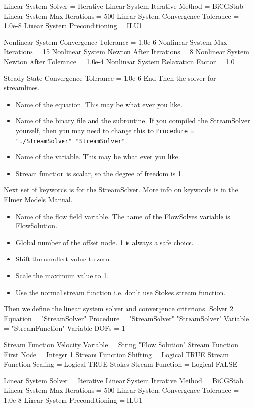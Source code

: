   Linear System Solver = Iterative
  Linear System Iterative Method = BiCGStab
  Linear System Max Iterations = 500
  Linear System Convergence Tolerance = 1.0e-8
  Linear System Preconditioning = ILU1

  Nonlinear System Convergence Tolerance = 1.0e-6
  Nonlinear System Max Iterations = 15
  Nonlinear System Newton After Iterations = 8
  Nonlinear System Newton After Tolerance = 1.0e-4
  Nonlinear System Relaxation Factor = 1.0

  Steady State Convergence Tolerance = 1.0e-6
End
\ttend
Then the solver for streamlines.
\begin{itemize}
\item Name of the equation. This may be what ever you like.
\item Name of the binary file and the subroutine. If you compiled the StreamSolver yourself,
then you may need to change this to \texttt{Procedure = "./StreamSolver" "StreamSolver"}.
\item Name of the variable. This may be what ever you like.
\item Stream function is scalar, so the degree of freedom is 1.
\end{itemize}
Next set of keywords is for the StreamSolver. More info on keywords is in the Elmer
Models Manual.
\begin{itemize}
\item Name of the flow field variable. The name of the FlowSolves variable is FlowSolution.
\item Global number of the offset node. 1 is always a safe choice.
\item Shift the smallest value to zero.
\item Scale the maximum value to 1.
\item Use the normal stream function i.e. don't use Stokes stream function.
\end{itemize}
Then we define the linear system solver and convergence criterions.
\ttbegin
Solver 2
  Equation = "StreamSolver"
  Procedure = "StreamSolver" "StreamSolver"
  Variable = "StreamFunction"
  Variable DOFs = 1

  Stream Function Velocity Variable = String "Flow Solution"
  Stream Function First Node = Integer 1
  Stream Function Shifting = Logical TRUE
  Stream Function Scaling = Logical TRUE
  Stokes Stream Function = Logical FALSE

  Linear System Solver = Iterative
  Linear System Iterative Method = BiCGStab
  Linear System Max Iterations = 500
  Linear System Convergence Tolerance = 1.0e-8
  Linear System Preconditioning = ILU1

